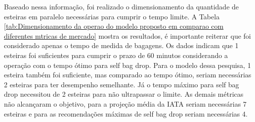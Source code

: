     Baseado nessa informação, foi realizado o dimensionamento da quantidade de esteiras em paralelo necessárias para cumprir o tempo limite. A Tabela \ref{tab:Dimensionamento da operao do modelo proposto em comparao com diferentes mtricas de mercado} mostra os resultados, é importante reiterar que foi considerado apenas o tempo de medida de bagagens. Os dados indicam que 1 esteiras foi suficientes para cumprir o prazo de 60 minutos considerando a operação com o tempo ótimo para self bag drop. Para o modelo dessa pesquisa, 1 esteira também foi suficiente, mas comparado ao tempo ótimo, seriam necessárias 2 esteiras para ter desempenho semelhante. Já o tempo máximo para self bag drop necessitou de 2 esteiras para não ultrapassar o limite. As demais métricas não alcançaram o objetivo, para a projeção média da IATA seriam necessárias 7 esteiras e para as recomendações máximas de self bag drop seriam necessárias 4. 

